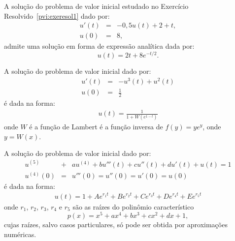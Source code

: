 \begin{ex} A solução do problema de valor inicial estudado no Exercício Resolvido~\ref{pvi:exeresol1} dado por:
\begin{eqnarray*}
     u'(t)&=& -0,5u(t)+2+t,\\
            u(0) &=&  8,
\end{eqnarray*}
admite uma solução em forma de expressão analítica dada por:
\begin{equation*}
     u(t) = 2t+8e^{-t/2}. 
\end{equation*} 
\end{ex}

\begin{ex} A solução do problema de valor inicial dado por:
\begin{eqnarray*}
u'(t)&=&-u^3(t)+u^2(t)\\
u(0)&=&\frac{1}{2}
\end{eqnarray*}
é dada na forma:
\begin{eqnarray*}
u(t)=\frac{1}{1+W(e^{1-t})}
\end{eqnarray*}
onde $W$ é a função de Lambert é a função inversa de $f(y)=ye^y$, onde $y=W(x)$.
\end{ex}


\begin{ex} A solução do problema de valor inicial dado por:
\begin{eqnarray*}
u^{(5)}&+&au^{(4)}+bu'''(t)+cu''(t)+du'(t)+u(t)=1\\
u^{(4)}(0)&=&u'''(0)=u''(0)=u'(0)=u(0)
\end{eqnarray*}
é dada na forma:
\begin{eqnarray*}
u(t)=1+Ae^{r_1 t} + Be^{r_2 t} + Ce^{r_3 t} + De^{r_4 t} + Ee^{r_5 t} 
\end{eqnarray*}
onde $r_1$, $r_2$, $r_3$, $r_4$ e $r_5$ são as raízes do polinômio característico $$p(x)=x^5+ax^4+bx^3+cx^2+dx+1,$$
cujas raízes, salvo casos particulares, só pode ser obtida por aproximações numéricas.
 \end{ex}


